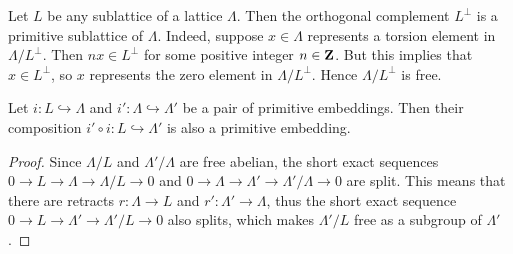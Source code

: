 \begin{example}
    \label{orthogonal complement primitive}
    Let $L$ be any sublattice of a lattice $\Lambda$. Then the orthogonal complement $L^\perp$ is a primitive sublattice of $\Lambda$. Indeed, suppose $x \in \Lambda$ represents a torsion element in $\Lambda/L^\perp$. Then $n x \in L^\perp$ for some positive integer $n \in \mathbf Z$. But this implies that $x \in L^\perp$, so $x$ represents the zero element in $\Lambda/L^\perp$. Hence $\Lambda/L^\perp$ is free.
\end{example}


    
    

\begin{lemma}
    \label{composition of primitive embeddings}
    Let $i \colon L \hookrightarrow \Lambda$ and $i' \colon \Lambda \hookrightarrow \Lambda'$ be a pair of primitive embeddings. Then their composition $i' \circ i \colon L \hookrightarrow \Lambda'$ is also a primitive embedding.
\end{lemma}

\begin{proof}
    Since $\Lambda/L$ and $\Lambda'/\Lambda$ are free abelian, the short exact sequences $0 \to L \to \Lambda \to \Lambda/L \to 0$ and $0 \to \Lambda \to \Lambda' \to \Lambda'/\Lambda \to 0$ are split. This means that there are retracts $r \colon \Lambda \to L$ and $r' \colon \Lambda' \to \Lambda$, thus the short exact sequence $0 \to L \to \Lambda' \to \Lambda'/L \to 0$ also splits, which makes $\Lambda'/L$ free as a subgroup of $\Lambda'$.
\end{proof}

